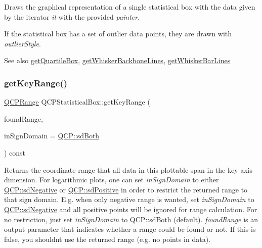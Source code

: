Draws the graphical representation of a single statistical box with the data given by the iterator {\itshape it} with the provided {\itshape painter}.

If the statistical box has a set of outlier data points, they are drawn with {\itshape outlier\+Style}.

\begin{DoxySeeAlso}{See also}
\hyperlink{class_q_c_p_statistical_box_aa44482bf991ceca74602294dd9977243}{get\+Quartile\+Box}, \hyperlink{class_q_c_p_statistical_box_a233c28f8c2464ed104a4d580eedd4c64}{get\+Whisker\+Backbone\+Lines}, \hyperlink{class_q_c_p_statistical_box_af478f6e8a5e9ca2f1bbac10a6b73319a}{get\+Whisker\+Bar\+Lines} 
\end{DoxySeeAlso}
\mbox{\label{class_q_c_p_statistical_box_a77d2d13301dfe60c13adfaa17fc1802f}} 
\subsubsection{\texorpdfstring{get\+Key\+Range()}{getKeyRange()}}
{\footnotesize\ttfamily \hyperlink{class_q_c_p_range}{Q\+C\+P\+Range} Q\+C\+P\+Statistical\+Box\+::get\+Key\+Range (\begin{DoxyParamCaption}\item[{bool \&}]{found\+Range,  }\item[{\hyperlink{namespace_q_c_p_afd50e7cf431af385614987d8553ff8a9}{Q\+C\+P\+::\+Sign\+Domain}}]{in\+Sign\+Domain = {\ttfamily \hyperlink{namespace_q_c_p_afd50e7cf431af385614987d8553ff8a9aa38352ef02d51ddfa4399d9551566e24}{Q\+C\+P\+::sd\+Both}} }\end{DoxyParamCaption}) const\hspace{0.3cm}{\ttfamily [virtual]}}

Returns the coordinate range that all data in this plottable span in the key axis dimension. For logarithmic plots, one can set {\itshape in\+Sign\+Domain} to either \hyperlink{namespace_q_c_p_afd50e7cf431af385614987d8553ff8a9a2d18af0bc58f6528d1e82ce699fe4829}{Q\+C\+P\+::sd\+Negative} or \hyperlink{namespace_q_c_p_afd50e7cf431af385614987d8553ff8a9a584784b75fb816abcc627cf743bb699f}{Q\+C\+P\+::sd\+Positive} in order to restrict the returned range to that sign domain. E.\+g. when only negative range is wanted, set {\itshape in\+Sign\+Domain} to \hyperlink{namespace_q_c_p_afd50e7cf431af385614987d8553ff8a9a2d18af0bc58f6528d1e82ce699fe4829}{Q\+C\+P\+::sd\+Negative} and all positive points will be ignored for range calculation. For no restriction, just set {\itshape in\+Sign\+Domain} to \hyperlink{namespace_q_c_p_afd50e7cf431af385614987d8553ff8a9aa38352ef02d51ddfa4399d9551566e24}{Q\+C\+P\+::sd\+Both} (default). {\itshape found\+Range} is an output parameter that indicates whether a range could be found or not. If this is false, you shouldn\textquotesingle{}t use the returned range (e.\+g. no points in data).

